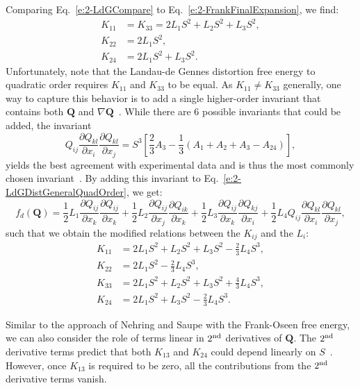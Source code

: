 Comparing Eq.~\ref{e:2-LdGCompare} to Eq.~\ref{e:2-FrankFinalExpansion}, we find:
\begin{align}
  K_{11} &= K_{33} = 2 L_1 S^2 + L_2 S^2 +L_3 S^2,\\
  K_{22} &= 2 L_1 S^2,\\
  K_{24} &= 2 L_1 S^2 + L_3 S^2.
\end{align}
Unfortunately, note that the Landau-de Gennes distortion free energy to quadratic order requires $K_{11}$ and $K_{33}$ to be equal.
As $K_{11} \neq K_{33}$ generally, one way to capture this behavior is to add a single higher-order invariant that contains both $\mathbf{Q}$ and $\nabla \mathbf{Q}$~\cite{RN189,RN198,RN190}.
While there are 6 possible invariants that could be added, the invariant
\begin{equation}
  Q_{ij}\frac{\partial Q_{kl}}{\partial x_i} \frac{\partial Q_{kl}}{\partial x_j} = S^3 \left [\frac{2}{3}A_3 - \frac{1}{3}(A_1+A_2+A_3-A_{24}) \right ],\label{e:2-LdGHigherOrderInvariant}
\end{equation}
yields the best agreement with experimental data and is thus the most commonly chosen invariant~\cite{RN189,RN198,RN190}.
By adding this invariant to Eq.~\ref{e:2-LdGDistGeneralQuadOrder}, we get:
\begin{equation}
  f_d(\mathbf{Q}) = \frac{1}{2} L_1 \frac{\partial Q_{ij}}{\partial x_k} \frac{\partial Q_{ij}}{\partial x_k}
    + \frac{1}{2} L_2 \frac{\partial Q_{ij}}{\partial x_j} \frac{\partial Q_{ik}}{\partial x_k}
    + \frac{1}{2} L_3 \frac{\partial Q_{ij}}{\partial x_k} \frac{\partial Q_{kj}}{\partial x_i}
    + \frac{1}{2} L_4 Q_{ij}\frac{\partial Q_{kl}}{\partial x_i} \frac{\partial Q_{kl}}{\partial x_j},\label{e:2-LdGDistGeneralHighOrder}
\end{equation}
such that we obtain the modified relations between the $K_{ij}$ and the $L_i$:
\begin{align}
  K_{11} &= 2 L_1 S^2 + L_2 S^2 +L_3 S^2 - \frac{2}{3}L_4 S^3,\label{e:2-LdGFrankRelationsA} \\
  K_{22} &= 2 L_1 S^2 - \frac{2}{3}L_4 S^3, \\
  K_{33} &= 2 L_1 S^2 + L_2 S^2 +L_3 S^2 + \frac{4}{3}L_4 S^3,\label{e:2-LdGFrankRelationsC}\\
  K_{24} &= 2 L_1 S^2 + L_3 S^2 - \frac{2}{3}L_4 S^3.\label{e:2-LdGFrankRelationsD}
\end{align}


Similar to the approach of Nehring and Saupe with the Frank-Oseen free energy, we can also consider the role of terms linear in $2^{\rm nd}$ derivatives of $\mathbf{Q}$.
The $2^{\rm nd}$ derivative terms predict that both $K_{13}$ and $K_{24}$ could depend linearly on $S$~\cite{RN58}.
However, once $K_{13}$ is required to be zero, all the contributions from the $2^{\rm nd}$ derivative terms vanish.\\



